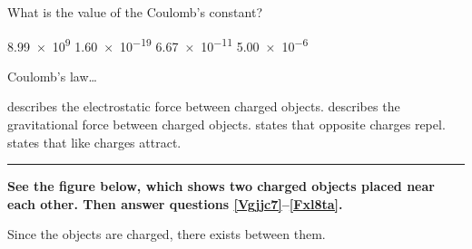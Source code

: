 \documentclass{exam}
\begin{document}
\begin{questions}
\question
What is the value of the Coulomb's constant?

\begin{randomizechoices}
    \correctchoice \num{8.99e9}
    \choice \num{1.60e-19}
    \choice \num{6.67e-11}
    \choice \num{5.00e-6}
\end{randomizechoices}

\question
Coulomb's law\ldots

\begin{randomizechoices}
    \correctchoice describes the electrostatic force between charged objects.
    \choice describes the gravitational force between charged objects.
    \choice states that opposite charges repel.
    \choice states that like charges attract.
\end{randomizechoices}
\vspace{1em}
\hrule

\clearpage
\begin{EnvUplevel}
\textbf{See the figure below, which shows two charged objects placed near each other. Then answer questions \ref{Vgjjc7}--\ref{Fxl8ta}.}
\end{EnvUplevel}

\vspace{-1em}


\def\distanceA{5}
\def\distanceR{3}

\begin{center}
\end{center}

\question \label{Vgjjc7}
Since the objects are charged, there exists \fillin[][5cm] between them.


\end{questions}
\end{document}

